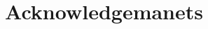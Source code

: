 \documentclass[12pt,a4paper]{article}
\title{}
\author{}
\date{}
\begin{document}
\maketitle
\pagebreak

\begin{abstract}

\end{abstract}

\tableofcontents
\printglossary[type=\acronymtype,style=long]




\section*{Acknowledgemanets}%
\label{sec:acknowledgemanets}

\printbibliography%
\end{document}
